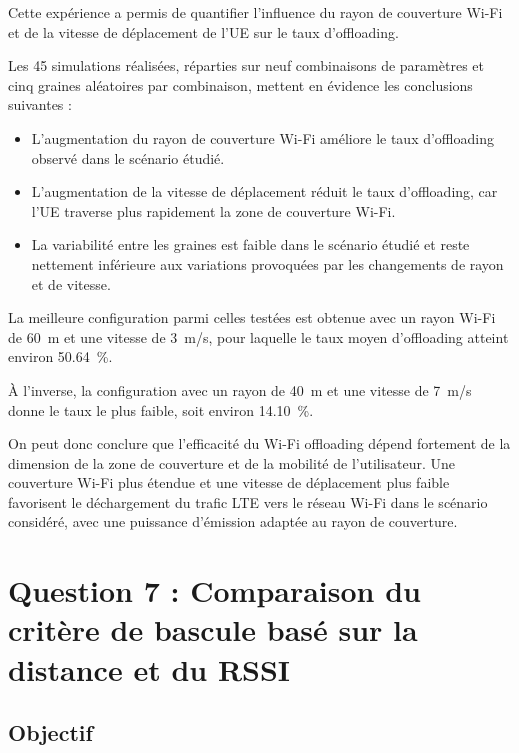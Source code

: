 Cette expérience a permis de quantifier l'influence du
rayon de couverture Wi-Fi et de la vitesse de déplacement
de l'UE sur le taux d'offloading.

Les 45 simulations réalisées, réparties sur neuf combinaisons
de paramètres et cinq graines aléatoires par combinaison,
mettent en évidence les conclusions suivantes :

\begin{itemize}

\item L'augmentation du rayon de couverture Wi-Fi améliore
le taux d'offloading observé dans le scénario étudié.

\item L'augmentation de la vitesse de déplacement réduit
le taux d'offloading, car l'UE traverse plus rapidement
la zone de couverture Wi-Fi.

\item La variabilité entre les graines est faible dans
le scénario étudié et reste nettement inférieure aux
variations provoquées par les changements de rayon et
de vitesse.

\end{itemize}

La meilleure configuration parmi celles testées est obtenue
avec un rayon Wi-Fi de \SI{60}{m} et une vitesse de
\SI{3}{m/s}, pour laquelle le taux moyen d'offloading
atteint environ \SI{50,64}{\percent}.

À l'inverse, la configuration avec un rayon de \SI{40}{m}
et une vitesse de \SI{7}{m/s} donne le taux le plus faible,
soit environ \SI{14,10}{\percent}.

On peut donc conclure que l'efficacité du Wi-Fi offloading
dépend fortement de la dimension de la zone de couverture
et de la mobilité de l'utilisateur. Une couverture Wi-Fi
plus étendue et une vitesse de déplacement plus faible
favorisent le déchargement du trafic LTE vers le réseau
Wi-Fi dans le scénario considéré, avec une puissance
d'émission adaptée au rayon de couverture.



\section{Question 7 : Comparaison du critère de bascule basé sur la distance et du RSSI}

\subsection{Objectif}

